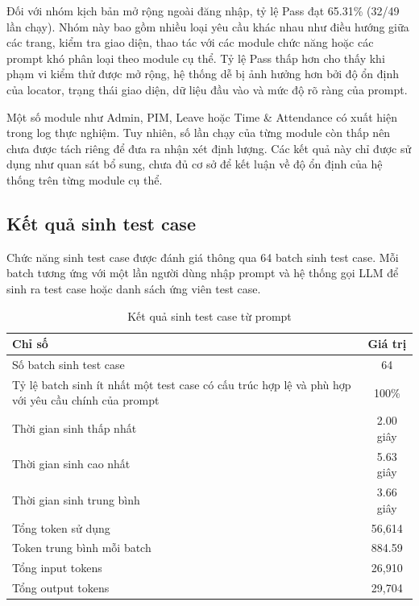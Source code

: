 Đối với nhóm kịch bản mở rộng ngoài đăng nhập, tỷ lệ Pass đạt 65.31\% (32/49 lần chạy). Nhóm này bao gồm nhiều loại yêu cầu khác nhau như điều hướng giữa các trang, kiểm tra giao diện, thao tác với các module chức năng hoặc các prompt khó phân loại theo module cụ thể. Tỷ lệ Pass thấp hơn cho thấy khi phạm vi kiểm thử được mở rộng, hệ thống dễ bị ảnh hưởng hơn bởi độ ổn định của locator, trạng thái giao diện, dữ liệu đầu vào và mức độ rõ ràng của prompt.

Một số module như Admin, PIM, Leave hoặc Time \& Attendance có xuất hiện trong log thực nghiệm. Tuy nhiên, số lần chạy của từng module còn thấp nên chưa được tách riêng để đưa ra nhận xét định lượng. Các kết quả này chỉ được sử dụng như quan sát bổ sung, chưa đủ cơ sở để kết luận về độ ổn định của hệ thống trên từng module cụ thể.

\subsection{Kết quả sinh test case}

Chức năng sinh test case được đánh giá thông qua 64 batch sinh test case. Mỗi batch tương ứng với một lần người dùng nhập prompt và hệ thống gọi LLM để sinh ra test case hoặc danh sách ứng viên test case.

\begin{table}[H]
\centering
\caption{Kết quả sinh test case từ prompt}
\label{tab:chapter6_testcase_generation_result}
\renewcommand{\arraystretch}{1.2}
\begin{tabular}{|p{8.5cm}|c|}
\hline
\textbf{Chỉ số} & \textbf{Giá trị} \\
\hline
Số batch sinh test case & 64 \\
\hline
Tỷ lệ batch sinh ít nhất một test case có cấu trúc hợp lệ và phù hợp với yêu cầu chính của prompt & 100\% \\
\hline
Thời gian sinh thấp nhất & 2.00 giây \\
\hline
Thời gian sinh cao nhất & 5.63 giây \\
\hline
Thời gian sinh trung bình & 3.66 giây \\
\hline
Tổng token sử dụng & 56,614 \\
\hline
Token trung bình mỗi batch & 884.59 \\
\hline
Tổng input tokens & 26,910 \\
\hline
Tổng output tokens & 29,704 \\
\hline
\end{tabular}
\end{table}

